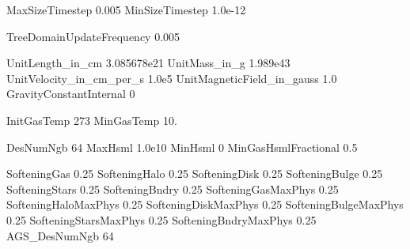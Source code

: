 MaxSizeTimestep         0.005   %
MinSizeTimestep         1.0e-12 %

TreeDomainUpdateFrequency   0.005	%

UnitLength_in_cm            3.085678e21     %
UnitMass_in_g               1.989e43  	    %
UnitVelocity_in_cm_per_s    1.0e5   	    %
UnitMagneticField_in_gauss  1.0   	        %
GravityConstantInternal     0		        %

InitGasTemp     273	    %
MinGasTemp      10.	    %

DesNumNgb               64      %
MaxHsml                 1.0e10  %
MinHsml                 0       %
MinGasHsmlFractional	0.5

SofteningGas    0.25    %
SofteningHalo   0.25    %
SofteningDisk   0.25    %
SofteningBulge  0.25    %
SofteningStars  0.25    %
SofteningBndry  0.25    %
SofteningGasMaxPhys     0.25    %
SofteningHaloMaxPhys    0.25 
SofteningDiskMaxPhys    0.25 
SofteningBulgeMaxPhys   0.25 
SofteningStarsMaxPhys   0.25 
SofteningBndryMaxPhys   0.25 
AGS_DesNumNgb           64  %





